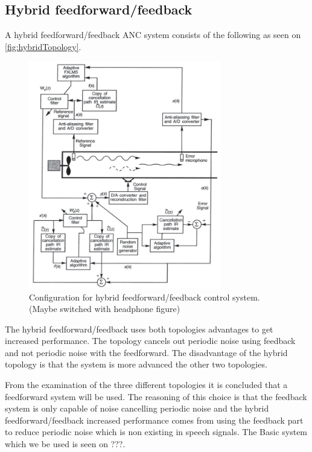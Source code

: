 \subsection*{Hybrid feedforward/feedback}    
A hybrid feedforward/feedback ANC system consists of the following as seen on \autoref{fig:hybridTopology}.
\begin{figure}[H]
	\centering
	\includegraphics[width=0.75\textwidth]{figures/BasicSystem/hybrid}
	\caption{Configuration for hybrid feedforward/feedback control system. (Maybe switched with headphone figure)}
	\label{fig:hybridTopology}
\end{figure}

The hybrid feedforward/feedback uses both topologies advantages to get increased performance. The topology cancels out periodic noise using feedback and not periodic noise with the feedforward. The disadvantage of the hybrid topology is that the system is more advanced the other two topologies.   

From the examination of the three different topologies it is concluded that a feedforward system will be used. The reasoning of this choice is that the feedback system is only capable of noise cancelling periodic noise and the hybrid feedforward/feedback increased performance comes from using the feedback part to reduce periodic noise which is non existing in speech signals. The Basic system which we be used is seen on ???.



